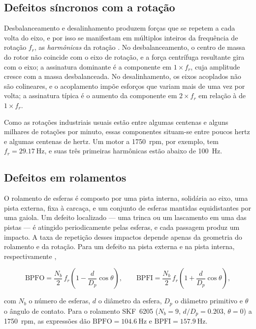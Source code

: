 \subsection{Defeitos síncronos com a rotação}

Desbalanceamento e desalinhamento produzem forças que se repetem a cada volta do eixo, e
por isso se manifestam em múltiplos inteiros da frequência de rotação $f_r$, as
\emph{harmônicas} da rotação \cite{randall2011livro}. No desbalanceamento, o centro de
massa do rotor não coincide com o eixo de rotação, e a força centrífuga resultante gira com
o eixo; a assinatura dominante é a componente em $1\times f_r$, cuja amplitude cresce com a
massa desbalanceada. No desalinhamento, os eixos acoplados não são colineares, e o
acoplamento impõe esforços que variam mais de uma vez por volta; a assinatura típica é o
aumento da componente em $2\times f_r$ em relação à de $1\times f_r$.

Como as rotações industriais usuais estão entre algumas centenas e alguns milhares de
rotações por minuto, essas componentes situam-se entre poucos hertz e algumas centenas de
hertz. Um motor a \SI{1750}{rpm}, por exemplo, tem $f_r = \SI{29,17}{\hertz}$, e suas três
primeiras harmônicas estão abaixo de \SI{100}{\hertz}.

\subsection{Defeitos em rolamentos}
\label{sec:fund-rolamento}

O rolamento de esferas é composto por uma pista interna, solidária ao eixo, uma pista
externa, fixa à carcaça, e um conjunto de esferas mantidas equidistantes por uma gaiola.
Um defeito localizado --- uma trinca ou um lascamento em uma das pistas --- é atingido
periodicamente pelas esferas, e cada passagem produz um impacto. A taxa de repetição desses
impactos depende apenas da geometria do rolamento e da rotação. Para um defeito na pista
externa e na pista interna, respectivamente \cite{randall2011},

\begin{equation}
\mathrm{BPFO} = \frac{N_b}{2}\, f_r \left(1 - \frac{d}{D_p}\cos\theta\right),
\qquad
\mathrm{BPFI} = \frac{N_b}{2}\, f_r \left(1 + \frac{d}{D_p}\cos\theta\right),
\label{eq:fund-bpfo}
\end{equation}

\noindent
com $N_b$ o número de esferas, $d$ o diâmetro da esfera, $D_p$ o diâmetro primitivo e
$\theta$ o ângulo de contato. Para o rolamento SKF~6205 ($N_b = 9$, $d/D_p = \num{0,203}$,
$\theta = 0$) a \SI{1750}{rpm}, as expressões dão $\mathrm{BPFO} = \SI{104,6}{\hertz}$ e
$\mathrm{BPFI} = \SI{157,9}{\hertz}$.

